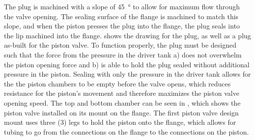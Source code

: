 The plug is machined with a slope of \SI{45}{\degree} to allow for maximum flow through the valve opening. The sealing surface of the flange is machined to match this slope, and when the piston presses the plug into the flange, the plug seals into the lip machined into the flange.  shows the drawing for the plug, as well as a plug as-built for the piston valve. To function properly, the plug must be designed such that the force from the pressure in the driver tank a) does not overwhelm the piston opening force and b) is able to hold the plug sealed without additional pressure in the piston. Sealing with only the pressure in the driver tank allows for the the piston chambers to be empty before the valve opens, which reduces resistance for the piston's movement and therefore maximizes the piston valve opening speed. The top and bottom chamber can be seen in , which shows the piston valve installed on its mount on the flange. The first piston valve design mount uses three (3) legs to hold the piston onto the flange, which allows for tubing to go from the connections on the flange to the connections on the piston.





